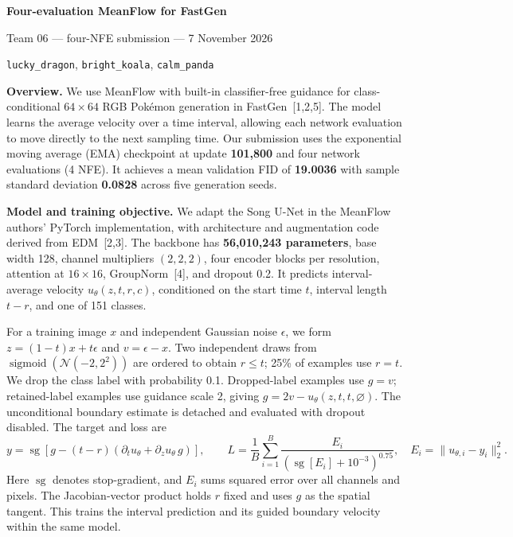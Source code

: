 \documentclass[10pt,a4paper]{article}
\newcommand{\sg}{\operatorname{sg}}
\begin{document}
\begin{center}
{\Large\bfseries Four-evaluation MeanFlow for FastGen}\par
{\normalsize Team 06 --- four-NFE submission --- 7 November 2026}\par
{\small\texttt{lucky\_dragon}, \texttt{bright\_koala}, \texttt{calm\_panda}}
\end{center}

\textbf{Overview.} We use MeanFlow with built-in classifier-free guidance for class-conditional $64\times64$ RGB Pok\'emon generation in FastGen~[1,2,5]. The model learns the average velocity over a time interval, allowing each network evaluation to move directly to the next sampling time. Our submission uses the exponential moving average (EMA) checkpoint at update \textbf{101,800} and four network evaluations (4 NFE). It achieves a mean validation FID of \textbf{19.0036} with sample standard deviation \textbf{0.0828} across five generation seeds.

\textbf{Model and training objective.} We adapt the Song U-Net in the MeanFlow authors' PyTorch implementation, with architecture and augmentation code derived from EDM~[2,3]. The backbone has \textbf{56,010,243 parameters}, base width 128, channel multipliers $(2,2,2)$, four encoder blocks per resolution, attention at $16\times16$, GroupNorm~[4], and dropout 0.2. It predicts interval-average velocity $u_\theta(z,t,r,c)$, conditioned on the start time $t$, interval length $t-r$, and one of 151 classes.

For a training image $x$ and independent Gaussian noise $\epsilon$, we form $z=(1-t)x+t\epsilon$ and $v=\epsilon-x$. Two independent draws from $\operatorname{sigmoid}(\mathcal N(-2,2^2))$ are ordered to obtain $r\leq t$; 25\% of examples use $r=t$. We drop the class label with probability 0.1. Dropped-label examples use $g=v$; retained-label examples use guidance scale 2, giving $g=2v-u_\theta(z,t,t,\varnothing)$. The unconditional boundary estimate is detached and evaluated with dropout disabled. The target and loss are
\[
 y=\sg\!\left[g-(t-r)\left(\partial_tu_\theta+\partial_zu_\theta\,g\right)\right],
 \qquad
 L=\frac{1}{B}\sum_{i=1}^{B}\frac{E_i}{(\sg[E_i]+10^{-3})^{0.75}},
 \quad E_i=\|u_{\theta,i}-y_i\|_2^2.
\]
Here $\sg$ denotes stop-gradient, and $E_i$ sums squared error over all channels and pixels. The Jacobian-vector product holds $r$ fixed and uses $g$ as the spatial tangent. This trains the interval prediction and its guided boundary velocity within the same model.
\end{document}
